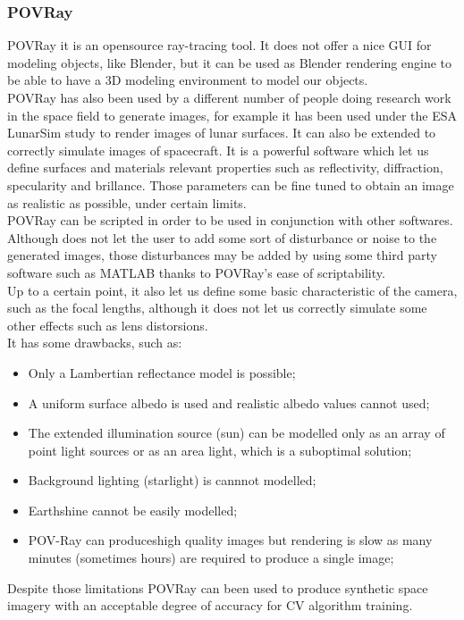 \subsubsection{POVRay}
POVRay it is an opensource ray-tracing tool. It does not offer a nice GUI for modeling objects, like Blender, but it can be used as Blender rendering engine to be able to have a 3D modeling environment to model our objects. \\
POVRay has also been used by a different number of people doing research work in the space field to generate images, for example it has been used under the ESA LunarSim study to render images of lunar surfaces. It can also be extended to correctly simulate images of spacecraft. It is a powerful software which let us define surfaces and materials relevant properties such as reflectivity, diffraction, specularity and brillance. Those parameters can be fine tuned to obtain an image as realistic as possible, under certain limits.\\
POVRay can be scripted in order to be used in conjunction with other softwares.\\
Although does not let the user to add some sort of disturbance or noise to the generated images, those disturbances may be added by using some third party software such as MATLAB thanks to POVRay's ease of scriptability.\\
Up to a certain point, it also let us define some basic characteristic of the camera, such as the focal lengths, although it does not let us correctly simulate some other effects such as lens distorsions.\\
It has some drawbacks, such as:
\begin{itemize}
    \item Only a Lambertian reflectance model is possible;
    \item A uniform surface albedo is used and realistic albedo values cannot used;
    \item The extended illumination source (sun) can be modelled only as an array of point light sources or as an area light, which is a suboptimal solution;
    \item Background lighting (starlight) is cannnot modelled;
    \item Earthshine cannot be easily modelled;
    \item POV-Ray can produceshigh quality images but rendering is slow as many minutes (sometimes hours) are required to produce a single image;
\end{itemize}
Despite those limitations POVRay can been used to produce synthetic space imagery with an acceptable degree of accuracy for CV algorithm training.\\


